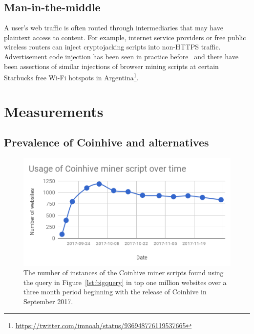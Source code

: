 \subsection{Man-in-the-middle} 

A user's web traffic is often routed through intermediaries that may have plaintext access to content. For example, internet service providers or free public wireless routers can inject cryptojacking scripts into non-HTTPS traffic. Advertisement code injection has been seen in practice before~\cite{vergeadinjection} and there have been assertions of similar injections of browser mining scripts at certain Starbucks free Wi-Fi hotspots in Argentina\footnote{\url{https://twitter.com/imnoah/status/936948776119537665}}.




%
%
%
%
%
%

\section{Measurements}

\subsection{Prevalence of Coinhive and alternatives}

\begin{figure}[h]
\centering
\includegraphics[width=\linewidth]{figures/usage_of_coinhive_over_time.png}
\caption{The number of instances of the Coinhive miner scripts found using the query in Figure~\ref{lst:bigquery} in top one million websites over a three month period beginning with the release of Coinhive in September 2017.\label{fig:topmil}}
\end{figure}


